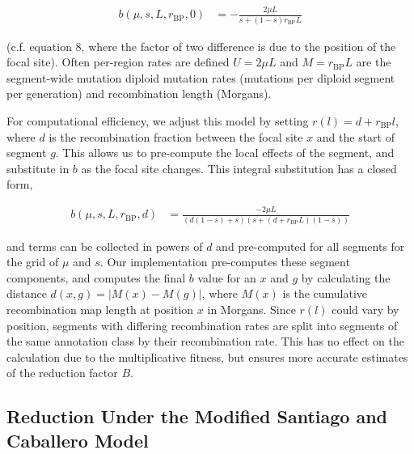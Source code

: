 \documentclass[11pt]{article}
\begin{document}
\begin{align}
  b(\mu, s, L, r_\text{BP}, 0) &= - \frac{2\mu L}{s + (1-s) r_\text{BP} L} 
\end{align}

(c.f. \cite{Hudson1995-xc} equation 8, where the factor of two difference is
due to the position of the focal site). Often per-region rates are defined $U =
2 \mu L$ and $M = r_\text{BP} L$ are the segment-wide mutation diploid mutation
rates (mutations per diploid segment per generation) and recombination length
(Morgans). 

For computational efficiency, we adjust this model by setting $r(l) = d +
r_\text{BP} l$, where $d$ is the recombination fraction between the focal site
$x$ and the start of segment $g$. This allows us to pre-compute the local
effects of the segment, and substitute in $b$ as the focal site changes. This
integral substitution has a closed form,

\begin{align}
  b(\mu, s, L, r_\text{BP}, d) &= \frac{-2\mu L}{(d(1-s) + s)(s + (d + r_\text{BP}L)(1-s))}
\end{align}

and terms can be collected in powers of $d$ and pre-computed for all segments
for the grid of $\mu$ and $s$. Our implementation pre-computes these segment
components, and computes the final $b$ value for an $x$ and $g$ by calculating
the distance $d(x,g) = |M(x) - M(g)|$, where $M(x)$ is the cumulative
recombination map length at position $x$ in Morgans. Since $r(l)$ could vary by
position, segments with differing recombination rates are split into segments
of the same annotation class by their recombination rate. This has no effect on
the calculation due to the multiplicative fitness, but ensures more accurate
estimates of the reduction factor $B$.


\subsection{Reduction Under the Modified Santiago and Caballero Model}
\end{document}
